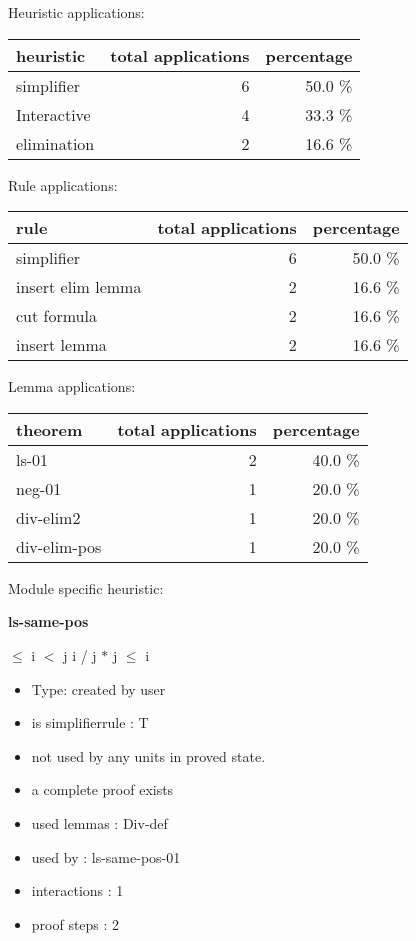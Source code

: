 \documentclass[a4paper]{article}
\begin{document}
\medskip


Heuristic applications:

\begin{supertabular}{l|r|r}
heuristic	& total applications & percentage \\ \hline
simplifier & 6 & 50.0 \% \\
Interactive & 4 & 33.3 \% \\
elimination & 2 & 16.6 \% \\

\end{supertabular}

Rule applications:

\begin{supertabular}{l|r|r}
rule	        & total applications & percentage \\ \hline
simplifier & 6 & 50.0 \% \\
insert elim lemma & 2 & 16.6 \% \\
cut formula & 2 & 16.6 \% \\
insert lemma & 2 & 16.6 \% \\

\end{supertabular}

Lemma applications:

\begin{supertabular}{l|r|r}
theorem	        & total applications & percentage \\ \hline
ls-01 & 2 & 40.0 \% \\
neg-01 & 1 & 20.0 \% \\
div-elim2 & 1 & 20.0 \% \\
div-elim-pos & 1 & 20.0 \% \\

\end{supertabular}

Module specific heuristic:

\pagebreak

{\LARGE\bf ls-same-pos}\label{lemma-ls-same-pos}

\medskip

  $\le$ i  $<$ j \Imp i / j $*$ j $\le$ i

\begin{itemize}

\item Type: created by user

\item is simplifierrule : T
\item not used by any units in proved state.
\item       a complete proof exists
\item       used lemmas  : Div-def
\item       used by      : ls-same-pos-01
\item       interactions : 1
\item       proof steps  : 2
\end{itemize}
\end{document}
